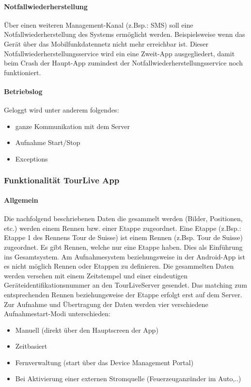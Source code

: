 \paragraph{Notfallwiederherstellung}
Über einen weiteren Management-Kanal (z.Bsp.: SMS) soll eine Notfallwiederherstellung des Systems ermöglicht werden. Beispielsweise wenn das Gerät über das Mobilfunkdatennetz nicht mehr erreichbar ist. Dieser Notfallwiederherstellungsservice wird ein eine Zweit-App ausgegliedert, damit beim Crash der Haupt-App zumindest der Notfallwiederherstellungsservice noch funktioniert.
\paragraph{Betriebslog}
Geloggt wird unter anderem folgendes:
\begin{itemize}
\item ganze Kommunikation mit dem Server
\item Aufnahme Start/Stop
\item Exceptions
\end{itemize}


\subsubsection{Funktionalität TourLive App}
\paragraph{Allgemein}
Die nachfolgend beschriebenen Daten die gesammelt werden (Bilder, Positionen, etc.) werden einem Rennen bzw. einer Etappe zugeordnet. Eine Etappe (z.Bsp.: Etappe 1 des Rennens Tour de Suisse) ist einem Rennen (z.Bsp. Tour de Suisse) zugeordnet. Es gibt Rennen, welche nur eine Etappe haben. Dies als Einführung ins Gesamtsystem. Am Aufnahmesystem beziehungsweise in der Android-App ist es nicht möglich Rennen oder Etappen zu definieren. Die gesammelten Daten werden versehen mit einem Zeitstempel und einer eindeutigen Geräteidentifikationsnummer an den TourLiveServer gesendet. Das matching zum entsprechenden Rennen beziehungsweise der Etappe erfolgt erst auf dem Server. \\

Zur Aufnahme  und Übertragung der Daten werden vier verschiedene Aufnahmestart-Modi unterschieden:
\begin{itemize}
	\item Manuell (direkt über den Hauptscreen der App)
	\item Zeitbasiert
	\item Fernverwaltung (start über das Device Management Portal)
	\item Bei Aktivierung einer externen Stromquelle (Feuerzeuganzünder im Auto,..)
\end{itemize}

